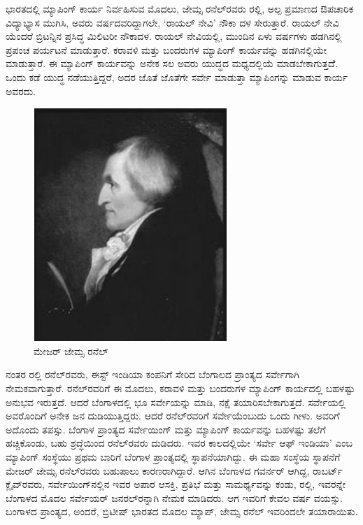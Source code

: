 \vskip 4pt

ಭಾರತದಲ್ಲಿ ಮ್ಯಾಪಿಂಗ್​ ಕಾರ್ಯ ನಿರ್ವಹಿಸುವ ಮೊದಲು, ಜೇಮ್ಸ ರನೆಲ್​ರವರು  ರಲ್ಲಿ, ಅಲ್ಪ ಪ್ರಮಾಣದ ಔಪಚಾರಿಕ ವಿದ್ಯಾಭ್ಯಾಸ ಮುಗಿಸಿ, ಅವರು  ವರ್ಷದವರಿದ್ದಾಗಲೇ, ‘ರಾಯಲ್​ ನೇವಿ’ ನೌಕಾ ದಳ ಸೇರುತ್ತಾರೆ. ರಾಯಲ್​ ನೇವಿ ಯೆಂದರೆ ಬ್ರಿಟನ್ನಿನ ಪ್ರಸಿದ್ಧ ಮಿಲಿಟರೀ ನೌಕಾದಳ. ರಾಯಲ್​ ನೇವಿಯಲ್ಲಿ, ಮುಂದಿನ ಏಳು ವರ್ಷಗಳು ಹಡಗಿನಲ್ಲಿ ಪ್ರಪಂಚ ಪರ್ಯಟನೆ ಮಾಡುತ್ತಾರೆ. ಕರಾವಳಿ ಮತ್ತು ಬಂದರುಗಳ ಮ್ಯಾಪಿಂಗ್​ ಕಾರ್ಯವನ್ನು ಹಡಗಿನಲ್ಲಿಯೇ ಮಾಡುತ್ತಾರೆ. ಈ ಮ್ಯಾಪಿಂಗ್​ ಕಾರ್ಯವನ್ನು ಅನೇಕ ಸಲ ಅವರು ಯುದ್ಧದ ಮಧ್ಯದಲ್ಲಿಯೆ ಮಾಡಬೇಕಾಗುತ್ತದೆೆ. ಒಂದು ಕಡೆ ಯುದ್ಧ ನಡೆಯುತ್ತಿದ್ದರೆ, ಅದರ ಜೊತೆ ಜೊತೆಗೇ ಸರ್ವೇ ಮಾಡುತ್ತಾ ಮ್ಯಾಪಿಂಗನ್ನು ಮಾಡುವ ಕಾರ್ಯ ಅವರದು.

\begin{figure}[!htbp]
\includegraphics{"images/image017.jpg"}
\caption{ಮೇಜರ್​ ಜೇಮ್ಸ ರನೆಲ್​}\label{art13-fig1}
\end{figure}

\newpage

ನಂತರ  ರಲ್ಲಿ ರನೆಲ್​ರವರು, ಈಸ್ಟ್​ ಇಂಡಿಯಾ ಕಂಪನಿಗೆ ಸೇರಿದ ಬೆಂಗಾಲದ ಪ್ರಾಂತ್ಯದ ಸರ್ವೇಗಾಗಿ ನೇಮಕವಾಗುತ್ತಾರೆ. ರನೆಲ್​ರವರಿಗೆ ಈ ಮೊದಲು, ಕರಾವಳಿ ಮತ್ತು ಬಂದರುಗಳ ಮ್ಯಾಪಿಂಗ್​ ಕಾರ್ಯದಲ್ಲಿ ಬಹಳಷ್ಟು ಅನುಭವ ಇರುತ್ತದೆ. ಆದರೆ ಬೆಂಗಾಳದಲ್ಲಿ ಭೂ ಸರ್ವೇಯನ್ನು ಮಾಡಿ, ನಕ್ಷೆ ತಯಾರಿಸಬೇಕಾಗುತ್ತದೆ. ಸರ್ವೇಯಲ್ಲಿ ಅವರೊಂದಿಗೆ ಅನೇಕ ಜನ ದುಡಿಯುತ್ತಿದ್ದರು. ಆದರೆ ರನೆಲ್​ರವರಿಗೆ ಸರ್ವೇಯೆಂಬುದು ಒಂದು ಗೀಳು. ಅವರಿಗೆ ಅದೊಂದು ತಪಸ್ಸು. ಬೆಂಗಾಳ ಪ್ರಾಂತ್ಯದ ಸರ್ವೇಯಿಂಗ್​ ಮತ್ತು ಮ್ಯಾಪಿಂಗ್​ ಕಾರ್ಯವನ್ನು ಬಹಳಷ್ಟು ತಲೆಗೆ ಹಚ್ಚಿಕೊಂಡು, ಬಹು ಶ್ರದ್ಧೆಯಿಂದ ರನೆಲ್​ರವರು ದುಡಿದರು. ಇವರ ಕಾಲದಲ್ಲಿಯೇ ‘ಸರ್ವೇ ಆಫ್​ ಇಂಡಿಯಾ’ ಎಂಬ ಮ್ಯಾಪಿಂಗ್​ ಸಂಸ್ಥೆಯು ಪ್ರಥಮ ಬಾರಿಗೆ ಬೆಂಗಾಳ ಪ್ರಾಂತ್ಯದಲ್ಲಿ ಸ್ಥಾಪನೆಯಾಗಿದ್ದು. ಈ ಮಹಾ ಸಂಸ್ಥೆಯ ಸ್ಥಾಪನೆಗೆ ಮೇಜರ್​ ಜೇಮ್ಸ ರನೆಲ್​ರವರು ಬಹುಪಾಲು ಕಾರಣರಾಗಿದ್ದಾರೆ. ಆಗಿನ ಬೆಂಗಾಳದ ಗವರ್ನರ್​ ಆಗಿದ್ದ, ರಾಬರ್ಟ್ ಕ್ಲೈವ್​ರವರು, ಸರ್ವೇಯಿಂಗ್​ನಲ್ಲಿನ ಇವರ ಅಪಾರ ಆಸಕ್ತಿ, ಪ್ರತಿಭೆ ಮತ್ತು ಸಾಮರ್ಥ್ಯವನ್ನು ಕಂಡು,  ರಲ್ಲಿ, ಇವರನ್ನೇ ಬೆಂಗಾಳದ ಮೊದಲ ಸರ್ವೇಯರ್​ ಜನರಲ್​ರನ್ನಾಗಿ ನೇಮಕ ಮಾಡಿದರು. ಆಗ ಇವರಿಗೆ ಕೇವಲ  ವರ್ಷ ವಯಸ್ಸು. ಬಂಗಾಳದ ಪ್ರಾಂತ್ಯದ, ಅಂದರೆ, ಬ್ರಿಟೀಷ್​ ಭಾರತದ ಮೊದಲ ಮ್ಯಾಪ್​, ಜೇಮ್ಸ ರನೆಲ್​ ಇವರಿಂದಲೇ ತಯಾರಾಯಿತು.

